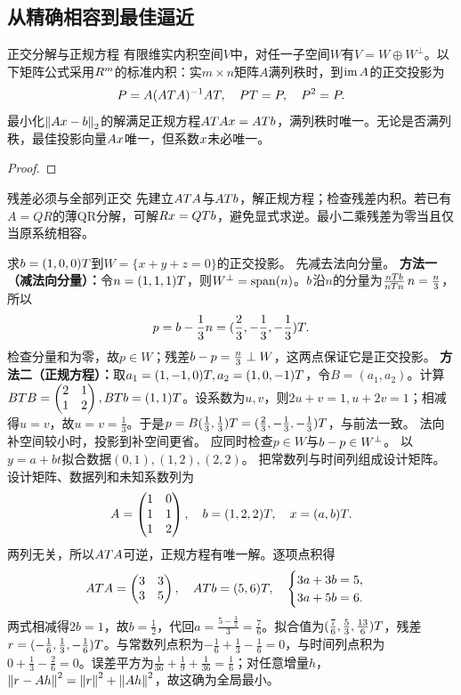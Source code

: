 \subsection{从精确相容到最佳逼近}
\begin{theorem}{正交分解与正规方程}
有限维实内积空间$V$中，对任一子空间$W$有$V=W\oplus W^\perp$。以下矩阵公式采用$R^m$的标准内积：实$m\times n$矩阵$A$满列秩时，到$\operatorname{im} A$的正交投影为
\begin{equation}P=A(AT A)^{-1} AT,\quad PT=P,\quad P^2=P.\label{eq:projection}\end{equation}
最小化$\left\lVert Ax-b\right\rVert_2$的解满足正规方程$AT Ax=ATb$，满列秩时唯一。无论是否满列秩，最佳投影向量$Ax$唯一，但系数$x$未必唯一。
\end{theorem}
\begin{proof}

\end{proof}
\begin{method}{残差必须与全部列正交}
先建立$AT A$与$ATb$，解正规方程；检查残差内积。若已有$A=QR$的薄QR分解，可解$Rx=QTb$，避免显式求逆。最小二乘残差为零当且仅当原系统相容。
\end{method}
{求$b=(1,0,0)T$到$W=\{x+y+z=0\}$的正交投影。}
{先减去法向分量。}
{\textbf{方法一（减法向分量）：}令$n=(1,1,1)T$，则$W^\perp=\operatorname{span}(n)$。$b$沿$n$的分量为$\frac{nTb}{nT n}\,n=\frac{n}{3}$，所以
\[p=b-\dfrac13n=(\dfrac{2}{3},-\dfrac{1}{3},-\dfrac{1}{3})T.\]
检查分量和为零，故$p\in W$；残差$b-p=\frac{n}{3}\perp W$，这两点保证它是正交投影。
\textbf{方法二（正规方程）：}取$a_1=(1,-1,0)T,a_2=(1,0,-1)T$，令$B=(a_1,a_2)$。计算$BT B=\begin{pmatrix}2&1\\1&2\end{pmatrix},BTb=(1,1)T$。设系数为$u,v$，则$2u+v=1,u+2v=1$；相减得$u=v$，故$u=v=\frac{1}{3}$。于是$p=B(\frac{1}{3},\frac{1}{3})T=(\frac{2}{3},-\frac{1}{3},-\frac{1}{3})T$，与前法一致。}
{法向补空间较小时，投影到补空间更省。}
{应同时检查$p\in W$与$b-p\in W^\perp$。}
{以$y=a+bt$拟合数据$(0,1),(1,2),(2,2)$。}
{把常数列与时间列组成设计矩阵。}
{设计矩阵、数据列和未知系数列为
\[A=\begin{pmatrix}1&0\\1&1\\1&2\end{pmatrix},\quad b=(1,2,2)T,\quad x=(a,b)T.\]
两列无关，所以$AT A$可逆，正规方程有唯一解。逐项点积得
\[AT A=\begin{pmatrix}3&3\\3&5\end{pmatrix},\quad ATb=(5,6)T,\quad
\begin{cases}3a+3b=5,\\3a+5b=6.\end{cases}\]
两式相减得$2b=1$，故$b=\frac{1}{2}$，代回$a=\frac{5-\frac{3}{2}}{3}=\frac{7}{6}$。拟合值为$(\frac{7}{6},\frac{5}{3},\frac{13}{6})T$，残差$r=(-\frac{1}{6},\frac{1}{3},-\frac{1}{6})T$。与常数列点积为$-\frac{1}{6}+\frac{1}{3}-\frac{1}{6}=0$，与时间列点积为$0+\frac{1}{3}-\frac{2}{6}=0$。误差平方为$\frac{1}{36}+\frac{1}{9}+\frac{1}{36}=\frac{1}{6}$；对任意增量$h$，$\left\lVert r-Ah\right\rVert^2=\left\lVert r\right\rVert^2+\left\lVert Ah\right\rVert^2$，故这确为全局最小。}
